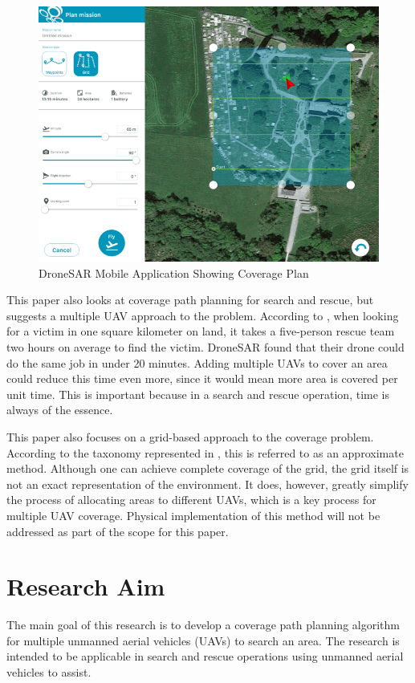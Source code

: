 \begin{figure}[h]
	\centering
	\includegraphics[scale=0.3]{figs/content_DroneSAR_screenshot_3.png}
	\caption{DroneSAR Mobile Application Showing Coverage Plan\cite{DroneSAR01}}
	\label{fig:DroneSAR}
\end{figure}

This paper also looks at coverage path planning for search and rescue, but suggests a multiple UAV approach to the problem. According to \cite{DroneSAR01}, when looking for a victim in one square kilometer on land, it takes a five-person rescue team two hours on average to find the victim. DroneSAR found that their drone could do the same job in under 20 minutes. Adding multiple UAVs to cover an area could reduce this time even more, since it would mean more area is covered per unit time. This is important because in a search and rescue operation, time is always of the essence.

This paper also focuses on a grid-based approach to the coverage problem. According to the taxonomy represented in \cite{Choset2001}, this is referred to as an approximate method. Although one can achieve complete coverage of the grid, the grid itself is not an exact representation of the environment. It does, however, greatly simplify the process of allocating areas to different UAVs, which is a key process for multiple UAV coverage. Physical implementation of this method will not be addressed as part of the scope for this paper.

\section{Research Aim}
\label{sec:intro_researchAim}
The main goal of this research is to develop a coverage path planning algorithm for multiple unmanned aerial vehicles (UAVs) to search an area. The research is intended to be applicable in search and rescue operations using unmanned aerial vehicles to assist.

